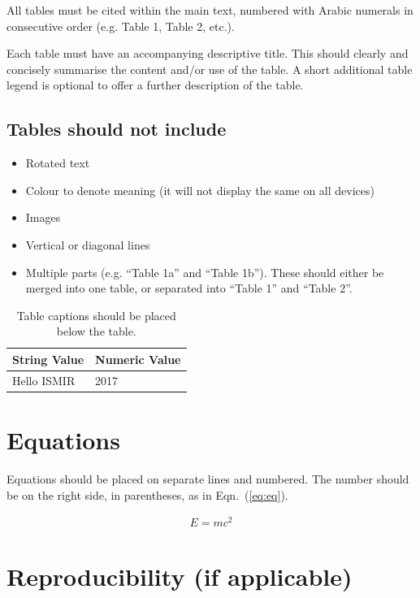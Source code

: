 \documentclass{article}
\begin{document}
All tables must be cited within the main text, numbered with Arabic
numerals in consecutive order (e.g. Table 1, Table 2, etc.).

Each table must have an accompanying descriptive title.
This should clearly and concisely summarise the content and/or
use of the table.
A short additional table legend is optional to offer a further
description of the table.

\subsection{Tables should not include}

\begin{itemize}
  \item Rotated text
  \item Colour to denote meaning (it will not display the same on all devices)
  \item Images
  \item Vertical or diagonal lines
  \item Multiple parts (e.g. ``Table 1a'' and ``Table 1b'').
  These should either be merged into one table,
  or separated into ``Table 1'' and ``Table 2''.
\end{itemize}

\begin{table}[htpb]
\centering
  \begin{tabular}{ll}
  \toprule
  \bfseries String Value & \bfseries Numeric Value \\ \midrule
  Hello ISMIR  & 2017          \\
  \bottomrule
  \end{tabular}
  \caption{Table captions should be placed below the table.}
\label{tab:table}
\end{table}

\section{Equations}\label{sec:equations}

Equations should be placed on separate lines and numbered.
The number should be on the right side, in parentheses,
as in Eqn.~(\ref{eq:eq}).

\begin{align}\label{eq:eq}
E = mc^2
\end{align}

\section{Reproducibility (if applicable)}
\end{document}
